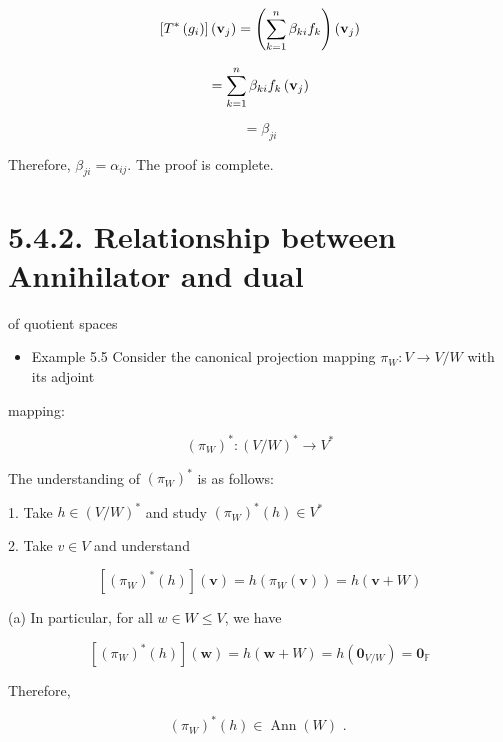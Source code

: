 \documentclass[11pt]{article}
\begin{document}
\[
\left\lbrack  {{T}^{ * }\left( {g}_{i}\right) }\right\rbrack  \left( {\bf v}_{j}\right)  = \left( {\mathop{\sum }\limits_{{k = 1}}^n\beta_{ki}{f}_{k}}\right) \left( {\bf v}_{j}\right)
\]

\[
= \mathop{\sum }\limits_{{k = 1}}^n\beta_{ki}{f}_{k}\left( {\bf v}_{j}\right)
\]

\[
= \beta_{ji}
\]

Therefore, \(\beta_{ji} = \alpha_{ij}\). The proof is complete.

\section*{5.4.2. Relationship between Annihilator and dual}

of quotient spaces


\begin{itemize}
\item Example 5.5 Consider the canonical projection mapping \({\pi }_{W} : V \rightarrow  V/W\) with its adjoint
\end{itemize}

mapping:

\[
{\left( {\pi }_{W}\right) }^{ * } : {\left( V/W\right) }^{ * } \rightarrow  {V}^{ * }
\]

The understanding of \({\left( {\pi }_{W}\right) }^{ * }\) is as follows:

\hspace*{2em} 1. Take \(h \in  {\left( V/W\right) }^{ * }\) and study \({\left( {\pi }_{W}\right) }^{ * }\left( h\right)  \in  {V}^{ * }\)

\hspace*{2em} 2. Take \(v \in  V\) and understand

\[
\left\lbrack  {{\left( {\pi }_{W}\right) }^{ * }\left( h\right) }\right\rbrack  \left( \mathbf{v}\right)  = h\left( {{\pi }_{W}\left( \mathbf{v}\right) }\right)  = h\left( {\mathbf{v} + W}\right)
\]

\hspace*{1em} (a) In particular, for all \(w \in  W \leq  V\), we have

\[
\left\lbrack  {{\left( {\pi }_{W}\right) }^{ * }\left( h\right) }\right\rbrack  \left( \mathbf{w}\right)  = h\left( {\mathbf{w} + W}\right)  = h\left( {\mathbf{0}}_{V/W}\right)  = {\mathbf{0}}_{\mathbb{F}}
\]

\hspace*{3em} Therefore,

\[
{\left( {\pi }_{W}\right) }^{ * }\left( h\right)  \in  \operatorname{Ann}\left( W\right) \text{ . }
\]
\end{document}
